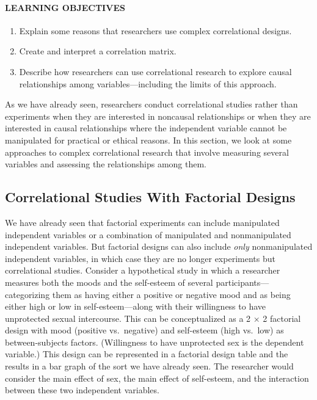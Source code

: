 \documentclass[
]{krantz}
\providecommand{\tightlist}{%
  \setlength{\itemsep}{0pt}\setlength{\parskip}{0pt}}
\begin{document}
\hypertarget{learning-objectives-22}{%
\paragraph*{LEARNING OBJECTIVES}\label{learning-objectives-22}}

\begin{enumerate}
\def\labelenumi{\arabic{enumi}.}
\tightlist
\item
  Explain some reasons that researchers use complex correlational designs.
\item
  Create and interpret a correlation matrix.
\item
  Describe how researchers can use correlational research to explore causal relationships among variables---including the limits of this approach.
\end{enumerate}

As we have already seen, researchers conduct correlational studies rather than experiments when they are interested in noncausal relationships or when they are interested in causal relationships where the independent variable cannot be manipulated for practical or ethical reasons. In this section, we look at some approaches to complex correlational research that involve measuring several variables and assessing the relationships among them.

\hypertarget{correlational-studies-with-factorial-designs}{%
\subsection*{Correlational Studies With Factorial Designs}\label{correlational-studies-with-factorial-designs}}


We have already seen that factorial experiments can include manipulated independent variables or a combination of manipulated and nonmanipulated independent variables. But factorial designs can also include \emph{only} nonmanipulated independent variables, in which case they are no longer experiments but correlational studies. Consider a hypothetical study in which a researcher measures both the moods and the self-esteem of several participants---categorizing them as having either a positive or negative mood and as being either high or low in self-esteem---along with their willingness to have unprotected sexual intercourse. This can be conceptualized as a 2 × 2 factorial design with mood (positive vs.~negative) and self-esteem (high vs.~low) as between-subjects factors. (Willingness to have unprotected sex is the dependent variable.) This design can be represented in a factorial design table and the results in a bar graph of the sort we have already seen. The researcher would consider the main effect of sex, the main effect of self-esteem, and the interaction between these two independent variables.
\end{document}
